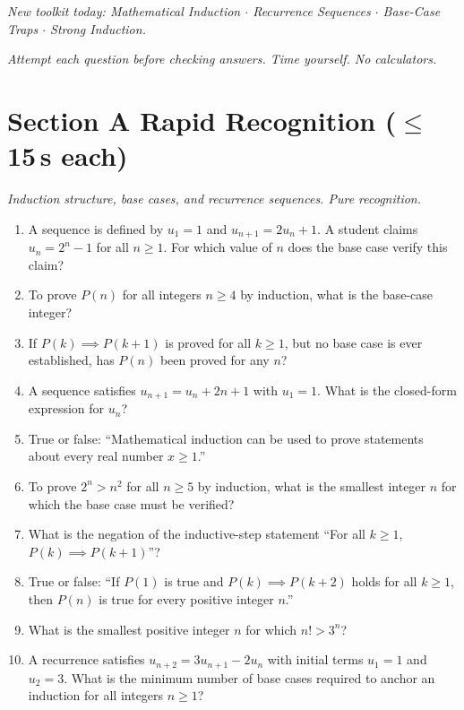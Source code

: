\documentclass[11pt,a4paper]{article}
\begin{document}
\noindent\textit{New toolkit today: Mathematical Induction $\cdot$ Recurrence Sequences $\cdot$ Base-Case Traps $\cdot$ Strong Induction.}

\vspace{2pt}
\noindent\textit{Attempt each question before checking answers. Time yourself. No calculators.}

\section*{Section A \quad Rapid Recognition \hfill{\normalfont\small($\leq$15\,s each)}}

\noindent\textit{Induction structure, base cases, and recurrence sequences. Pure recognition.}

\begin{enumerate}

\item A sequence is defined by $u_1 = 1$ and $u_{n+1} = 2u_n + 1$. A student claims $u_n = 2^n - 1$ for all $n \ge 1$. For which value of $n$ does the base case verify this claim?

\item To prove $P(n)$ for all integers $n\geq4$ by induction, what is the base-case integer?

\item If $P(k)\implies P(k+1)$ is proved for all $k\geq1$, but no base case is ever established, has $P(n)$ been proved for any $n$?

\item A sequence satisfies $u_{n+1} = u_n + 2n + 1$ with $u_1 = 1$. What is the closed-form expression for $u_n$?

\item True or false: ``Mathematical induction can be used to prove statements about every real number $x\geq1$.''

\item To prove $2^n>n^2$ for all $n\geq5$ by induction, what is the smallest integer $n$ for which the base case must be verified?

\item What is the negation of the inductive-step statement ``For all $k\geq1$, $P(k)\implies P(k+1)$''?

\item True or false: ``If $P(1)$ is true and $P(k)\implies P(k+2)$ holds for all $k\geq1$, then $P(n)$ is true for every positive integer $n$.''

\item What is the smallest positive integer $n$ for which $n!>3^n$?

\item A recurrence satisfies $u_{n+2} = 3u_{n+1} - 2u_n$ with initial terms $u_1 = 1$ and $u_2 = 3$. What is the minimum number of base cases required to anchor an induction for all integers $n\geq1$?

\end{enumerate}
\end{document}

